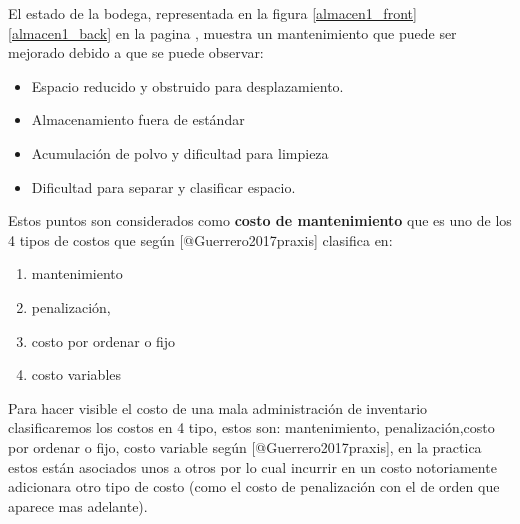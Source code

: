 \documentclass[a4papper,11pt]{article}
\begin{document}
    El estado de la bodega, representada en la figura \ref{almacen1_front}  \ref{almacen1_back} en la pagina \pageref{almacen1_front},  muestra un mantenimiento que puede ser mejorado debido a que se puede observar:

      \begin{itemize}
        \item Espacio reducido y obstruido para desplazamiento.
        \item Almacenamiento fuera de estándar
        \item Acumulación de polvo y dificultad para limpieza
        \item Dificultad para separar y clasificar espacio.
      \end{itemize}

    Estos puntos son considerados como \textbf{costo de mantenimiento} que es uno de los 4 tipos de costos que según [@Guerrero2017praxis] clasifica en:

      \begin{enumerate}
        \item mantenimiento
        \item penalización, 
        \item costo por ordenar o fijo
        \item costo variables
      \end{enumerate}
    
    Para hacer visible el costo de una mala administración de inventario clasificaremos los costos en 4 tipo, estos son: mantenimiento, penalización,costo por ordenar o fijo, costo variable según [@Guerrero2017praxis], en la practica estos están asociados unos a otros por lo cual incurrir en un costo notoriamente adicionara otro tipo de costo (como el costo de penalización con el de orden que aparece mas adelante).
\end{document}
